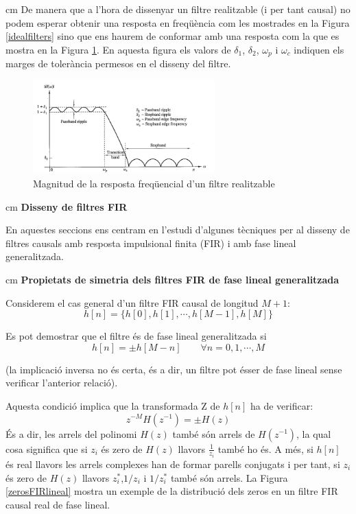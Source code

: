 \documentclass{article}
\begin{document}
 cm
De manera que a l'hora de dissenyar un filtre realitzable (i per tant causal) no podem esperar obtenir 
una resposta en freqüència com les mostrades en la Figura \ref{idealfilters} sino que ens haurem de 
conformar amb una resposta com la que es mostra en la Figura \ref{realizablefilters}.
En aquesta figura els valors de $\delta_1$, $\delta_2$, $\omega_p$ i $\omega_c$ indiquen els marges
de tolerància permesos en el disseny del filtre.

\begin{figure}[htbp]
\begin{center}
\includegraphics[width=7cm]{realizablefilters.png}
\end{center}
\caption{Magnitud de la resposta freqüencial d'un filtre realitzable}
\label{realizablefilters}
\end{figure}

 cm
\noindent
\textbf{Disseny de filtres FIR}

En aquestes seccions ens centram en l'estudi d'algunes tècniques per al disseny de filtres
causals amb resposta impulsional finita (FIR) i amb fase lineal generalitzada.

 cm
\noindent
\textbf{Propietats de simetria dels filtres FIR de fase lineal generalitzada}

Considerem el cas general d'un filtre FIR causal de longitud $M+1$:
\[
h[n]=\{ h[0], h[1], \cdots, h[M-1], h[M] \}
\]

Es pot demostrar que el filtre és de fase lineal generalitzada si 
\[
h[n]=\pm h[M-n] \qquad \forall n=0, 1, \cdots, M
\]

(la implicació inversa no és certa, és a dir, un filtre pot ésser de fase lineal
sense verificar l'anterior relació).

Aquesta condició implica que la transformada Z de $h[n]$ ha de verificar:
\[
z^{-M}H(z^{-1})=\pm H(z)
\]
\noindent
És a dir, les arrels del polinomi $H(z)$ també són arrels de $H(z^{-1})$, la qual cosa significa que si
$z_i$ és zero de $H(z)$ llavors $\frac{1}{z_i}$ també ho és. A més, si $h[n]$ és real llavors
les arrels complexes han de formar parells conjugats i per tant, si $z_i$ és zero de $H(z)$ llavors
$z_i^*$,$1/z_i$ i $1/z_i^*$ també són arrels. La Figura \ref{zerosFIRlineal} mostra un exemple
de la distribució dels zeros en un filtre FIR causal real de fase lineal.
\end{document}
